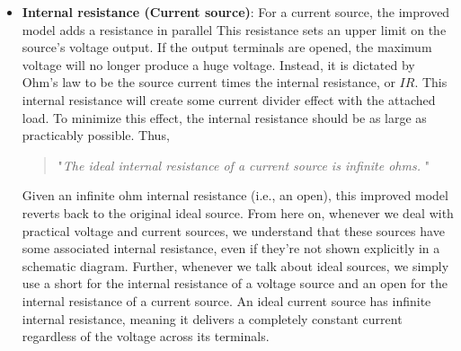 \documentclass{report}
\begin{document}
\begin{itemize}
            \begin{quote}
               "\textit{The ideal internal resistance of a voltage source is zero ohms (a short). }" 
            \end{quote}
            \bigbreak \noindent 
            Given a zero ohm internal resistance, this improved model reverts back to the original ideal source. In the case of a lab power supply, the internal resistance typically will be a small fraction of an ohm.
            \bigbreak \noindent 
            An ideal voltage source has zero internal resistance, meaning it maintains a completely constant terminal voltage regardless of how much current is drawn by the connected circuit. It provides a fixed voltage output at all times.
            \bigbreak \noindent 
            The voltage drop is then
            \begin{align*}
                V = IR = 0 
            .\end{align*}
        \item \textbf{Internal resistance (Current source)}: For a current source, the improved model adds a resistance in parallel
            \bigbreak \noindent 
            \bigbreak \noindent 
            This resistance sets an upper limit on the source's voltage output. If the output terminals are opened, the maximum voltage will no longer produce a huge voltage. Instead, it is dictated by Ohm's law to be the source current times the internal resistance, or $IR$. This internal resistance will create some current divider effect with the attached load. To minimize this effect, the internal resistance should be as large as practicably possible. Thus,
            \begin{quote}
               "\textit{The ideal internal resistance of a current source is infinite ohms. }" 
            \end{quote}
            \bigbreak \noindent 
            Given an infinite ohm internal resistance (i.e., an open), this improved model reverts back to the original ideal source. From here on, whenever we deal with practical voltage and current sources, we understand that these sources have some associated internal resistance, even if they're not shown explicitly in a schematic diagram. Further, whenever we talk about ideal sources, we simply use a short for the internal resistance of a voltage source and an open for the internal resistance of a current source.
            \bigbreak \noindent 
            An ideal current source has infinite internal resistance, meaning it delivers a completely constant current regardless of the voltage across its terminals.

\end{itemize}
\end{document}
